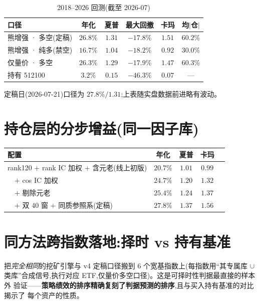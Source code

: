 \documentclass[11pt,a4paper,fontset=mac]{ctexart}
\begin{document}
\begin{table}[htbp]\centering
\caption{2018--2026 回测(截至 2026-07)}\label{tab:perf}
\small\begin{tabular}{lccccc}
\toprule
口径 & 年化 & 夏普 & 最大回撤 & 卡玛 & 均$|$仓$|$ \\
\midrule
熊增强 · 多空(定稿) & $\mathbf{26.8\%}$ & $\mathbf{1.31}$ & $-17.8\%$ & $1.51$ & $60.2\%$ \\
熊增强 · 纯多(禁空) & $16.7\%$ & $1.04$ & $-18.2\%$ & $0.92$ & $30.0\%$ \\
仅量价 · 多空       & $26.3\%$ & $1.29$ & $-17.9\%$ & $1.47$ & $60.3\%$ \\
持有 512100        & $3.2\%$  & $0.15$ & $-46.3\%$ & $0.07$ & --- \\
\bottomrule
\end{tabular}
\end{table}

\noindent 定稿日(2026-07-21)口径为 $27.8\%/1.31$;上表随实盘数据前进略有波动。

\section{持仓层的分步增益(同一因子库)}
\begin{table}[htbp]\centering
\small\begin{tabular}{lcccc}
\toprule
配置 & 年化 & 夏普 & 卡玛 \\
\midrule
rank120 $+$ rank IC 加权 $+$ 含元老(线上初版) & $20.7\%$ & $1.01$ & $0.99$ \\
\ \ $+$ cos IC 加权                          & $24.7\%$ & $1.20$ & $1.32$ \\
\ \ $+$ 剔除元老                             & $25.4\%$ & $1.24$ & $1.37$ \\
\ \ $+$ 双 40 窗 $+$ 同质参照系(定稿)        & $\mathbf{27.8\%}$ & $\mathbf{1.37}$ & $\mathbf{1.56}$ \\
\bottomrule
\end{tabular}
\end{table}

\section{同方法跨指数落地:择时 vs 持有基准}
把\emph{完全相同}的挖矿引擎与 v4 定稿口径搬到 6 个宽基指数上(每指数用``其专属库
$\cup$ 类库''合成信号,执行对应 ETF,仅量价多空口径)。这是可择时性判据最直接的样本外
验证——\textbf{策略绩效的排序精确复刻了判据预测的排序},且与买入持有基准的对比揭示了
每个资产的性质。
\end{document}
